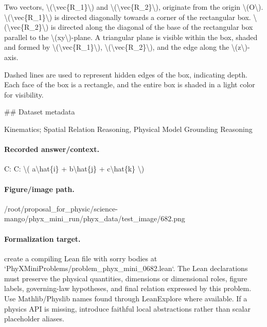 Two vectors, \textbackslash{}(\textbackslash{}vec\{R\_1\}\textbackslash{}) and \textbackslash{}(\textbackslash{}vec\{R\_2\}\textbackslash{}), originate from the origin \textbackslash{}(O\textbackslash{}). \textbackslash{}(\textbackslash{}vec\{R\_1\}\textbackslash{}) is directed diagonally towards a corner of the rectangular box. \textbackslash{}(\textbackslash{}vec\{R\_2\}\textbackslash{}) is directed along the diagonal of the base of the rectangular box parallel to the \textbackslash{}(xy\textbackslash{})-plane. A triangular plane is visible within the box, shaded and formed by \textbackslash{}(\textbackslash{}vec\{R\_1\}\textbackslash{}), \textbackslash{}(\textbackslash{}vec\{R\_2\}\textbackslash{}), and the edge along the \textbackslash{}(z\textbackslash{})-axis.

Dashed lines are used to represent hidden edges of the box, indicating depth. Each face of the box is a rectangle, and the entire box is shaded in a light color for visibility.

\#\# Dataset metadata

Kinematics; Spatial Relation Reasoning, Physical Model Grounding Reasoning

\paragraph{Recorded answer/context.}
C: C: \textbackslash{}( a\textbackslash{}hat\{i\} + b\textbackslash{}hat\{j\} + c\textbackslash{}hat\{k\} \textbackslash{})

\paragraph{Figure/image path.}
/root/proposal\_for\_physic/science-mango/phyx\_mini\_run/phyx\_data/test\_image/682.png

\paragraph{Formalization target.}
create a compiling Lean file with sorry bodies at `PhyXMiniProblems/problem\_phyx\_mini\_0682.lean`. The Lean declarations must preserve the physical quantities, dimensions or dimensional roles, figure labels, governing-law hypotheses, and final relation expressed by this problem.
Use Mathlib/Physlib names found through LeanExplore where available. If a physics API is missing, introduce faithful local abstractions rather than scalar placeholder aliases.

